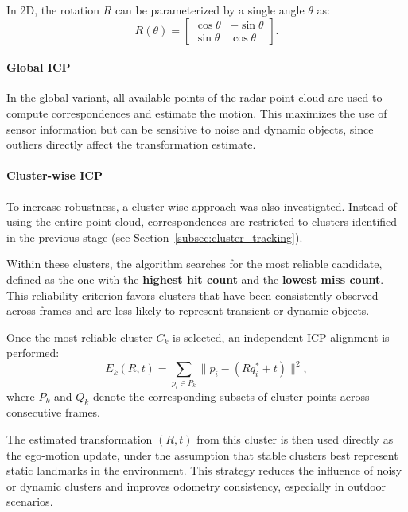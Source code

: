 In 2D, the rotation $R$ can be parameterized by a single angle $\theta$ as:
\begin{equation}
    R(\theta) = 
    \begin{bmatrix}
        \cos\theta & -\sin\theta \\
        \sin\theta & \cos\theta
    \end{bmatrix}.
\end{equation}


\paragraph{Global ICP}
In the global variant, all available points of the radar point cloud are used to compute correspondences and estimate the motion. 
This maximizes the use of sensor information but can be sensitive to noise and dynamic objects, since outliers directly affect the transformation estimate.

\paragraph{Cluster-wise ICP}
To increase robustness, a cluster-wise approach was also investigated.  
Instead of using the entire point cloud, correspondences are restricted to clusters identified in the previous stage (see Section~\ref{subsec:cluster_tracking}).  

Within these clusters, the algorithm searches for the most reliable candidate, defined as the one with the \textbf{highest hit count} and the \textbf{lowest miss count}.  
This reliability criterion favors clusters that have been consistently observed across frames and are less likely to represent transient or dynamic objects.  

Once the most reliable cluster $C_k$ is selected, an independent ICP alignment is performed:
\begin{equation}
    E_k(R,t) = \sum_{p_i \in P_k} \lVert p_i - (R q^*_i + t) \rVert^2,
\end{equation}
where $P_k$ and $Q_k$ denote the corresponding subsets of cluster points across consecutive frames.  

The estimated transformation $(R,t)$ from this cluster is then used directly as the ego-motion update, under the assumption that stable clusters best represent static landmarks in the environment.  
This strategy reduces the influence of noisy or dynamic clusters and improves odometry consistency, especially in outdoor scenarios.

